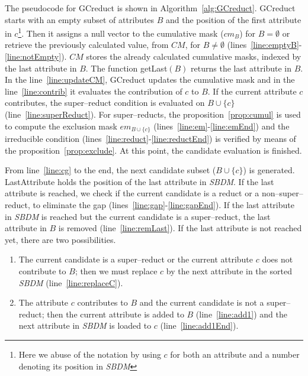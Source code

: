 \documentclass[authoryear,preprint,review,12pt]{elsarticle}
\begin{document}
		The pseudocode for GCreduct is shown in Algorithm~\ref{alg:GCreduct}. GCreduct starts with an empty subset of attributes $B$ and the position of the first attribute in $c$\footnote{Here we abuse of the notation by using $c$ for both an attribute and a number denoting its position in \textit{SBDM}}. Then it assigns a null vector to the cumulative mask ($cm_B$) for $B=\emptyset$ or retrieve the previously calculated value, from $CM$, for $B\neq \emptyset$ (lines~\ref{line:emptyB}-\ref{line:notEmpty}). $CM$ stores the already calculated cumulative masks, indexed by the last attribute in $B$. The function getLast$(B)$ returns the last attribute in $B$. In the line~\ref{line:updateCM}, GCreduct updates the cumulative mask and in		the line~\ref{line:contrib} it evaluates the contribution of $c$ to $B$. If the current attribute $c$ contributes, the super--reduct condition is evaluated on $B\cup \lbrace c\rbrace$ (line~\ref{line:superReduct}). For super--reducts, the proposition~\ref{prop:cumul} is used to compute the exclusion mask $em_{B\cup \lbrace c\rbrace}$ (lines~\ref{line:em}-\ref{line:emEnd}) and the irreducible condition (lines~\ref{line:reduct}-\ref{line:reductEnd}) is verified by means of the proposition~\ref{prop:exclude}. At this point, the candidate evaluation is finished.
		
		From line~\ref{line:cg} to the end, the next candidate subset ($B\cup \lbrace c\rbrace$) is generated. 
		LastAttribute holds the position of the last attribute in \textit{SBDM}. If the last attribute is
		reached, we check if the current candidate is a reduct or a non--super--reduct, to eliminate the gap
		(lines~\ref{line:gap}-\ref{line:gapEnd}). If the last attribute in \textit{SBDM} is reached but the current candidate is a super--reduct, the last attribute in $B$ is removed (line~\ref{line:remLast}). If the last attribute is 
		not reached yet, there are two possibilities. 
		\begin{enumerate}
			\item The current candidate is a super--reduct or the current attribute $c$ does not contribute to $B$; then we must replace $c$ by the next attribute in the sorted \textit{SBDM} (line~\ref{line:replaceC}).
			\item The attribute $c$ contributes to $B$ and the current candidate is not a super--reduct; then the current attribute is added to $B$ (line~\ref{line:add1}) and the next attribute in \textit{SBDM} is loaded to $c$ (line~\ref{line:add1End}).
		\end{enumerate}  
	
\end{document}
